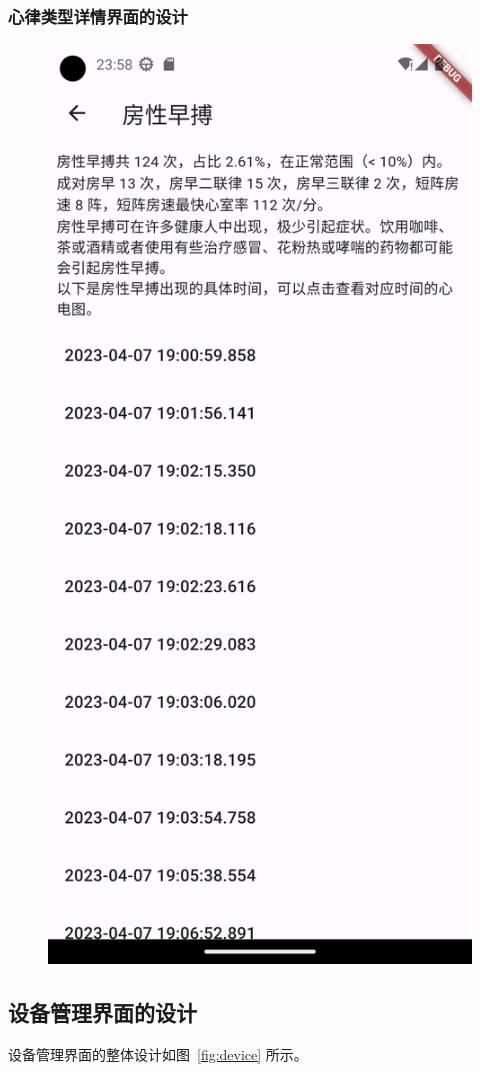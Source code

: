 \begin{figure}[h]
    \label{fig:analytics}
\end{figure}


\subsubsection{心律类型详情界面的设计}\label{subsubsec:label-details}


\begin{figure}[h]
    \centering
    \includegraphics[width=.33\textwidth]{../assets/label-details}
    \label{fig:label-details}
\end{figure}

\subsection{设备管理界面的设计}\label{subsec:device-design}

设备管理界面的整体设计如图~\ref{fig:device} 所示。

